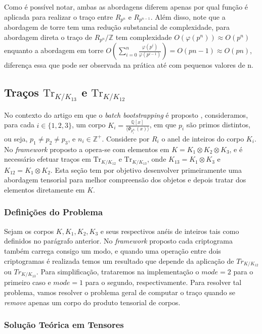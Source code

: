 Como é possível notar, ambas as abordagens diferem apenas por qual função é aplicada para realizar
o traço entre $R_{p^n}$ e $R_{p^{n-1}}$. Além disso, note que a abordagem de torre tem uma redução substancial
de complexidade, para abordagem direta o traço de $R_{p^n}/\mathbb{Z}$ tem complexidade $O(\varphi(p^n)) \approx O(p^n)$
enquanto a abordagem em torre $O(\sum_{i = 0}^{n} \frac{\varphi(p^i)}{\varphi(p^{i-1})}) = O(pn - 1) \approx O(pn)$, diferença 
essa que pode ser observada na prática até com pequenos valores de n.

\subsection{Traços $\mathrm{Tr}_{K/K_{13}}$ e $\mathrm{Tr}_{K/K_{12}}$}

No contexto do artigo em que o \textit{batch bootstrapping} é proposto \cite{lw23I}, consideramos, para cada $i \in \{1, 2, 3\}$, um corpo 
$K_i = \frac{\mathbb{Q}[x]}{\langle \Phi_{p_i^{n_i}}(x) \rangle}$, 
em que $p_i$ são primos distintos, ou seja, $p_1 \neq p_2 \neq p_3$, e $n_i \in \mathbb{Z}^+$. 
Considere por $R_i$ o anel de inteiros do corpo $K_i$. No \textit{framework} proposto a opera-se com 
elementos em $K = K_1 \otimes K_2 \otimes K_3$, e é necessário efetuar traços em $\mathrm{Tr}_{K/K_{12}}$ e
$\mathrm{Tr}_{K/K_{13}}$, onde $K_{13} = K_1 \otimes K_3$ e $K_{12} = K_1 \otimes K_2$. Esta seção tem por
objetivo desenvolver primeiramente uma abordagem tensorial para melhor compreensão dos objetos e depois tratar dos elementos
diretamente em $K$. 


\subsubsection{Definições do Problema}


Sejam os corpos $K, K_1, K_2, K_3$ e seus respectivos anéis de inteiros tais como definidos no parágrafo anterior. 
No \textit{framework} proposto cada criptograma também carrega consigo um modo, e quando uma operação entre dois criptogramas é realizada  
temos um resultado que depende da aplicação de $Tr_{K/K_{12}}$ ou $Tr_{K/K_{13}}$. Para simplificação, trataremos na implementação o $mode = 2$ para o primeiro caso 
e $mode = 1$ para o segundo, respectivamente. Para resolver tal problema, vamos resolver o problema geral de computar o traço quando se \textit{remove} apenas um corpo do produto tensorial de corpos.

\subsubsection{Solução Teórica em Tensores}

